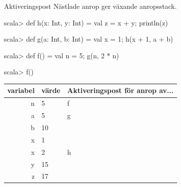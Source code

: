 %
%
%

\begin{Slide}{Aktiveringspost}\SlideFontSmall
Nästlade anrop ger växande anropsstack.
\begin{REPLsmall}
scala> def h(x: Int, y: Int) = { val z = x + y; println(z) }

scala> def g(a: Int, b: Int) = { val x = 1; h(x + 1, a + b) }

scala> def f() = { val n = 5; g(n, 2 * n) }

scala> f()

\end{REPLsmall}

\pause
{}

\begin{tabular}{|r | l | l |} \hline

variabel & värde & Aktiveringspost för anrop av... \\ \hline \hline
\pause
 n & 5 & f \\ \hline
 \pause
 a & 5 & g \\
 b & 10 &  \\
 x & 1  &  \\  \hline
 \pause
 x & 2  & h \\
 y & 15 &  \\
 z & 17 & \\ \hline
\end{tabular}
\end{Slide}

